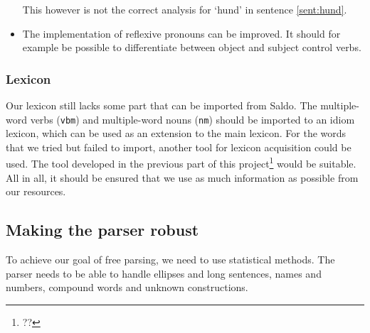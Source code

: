 \documentclass{report}
\begin{document}
\begin{itemize}
This however is not the correct analysis for `hund' in sentence \ref{sent:hund}.
\label{sent:hund}

\item
The implementation of reflexive pronouns can be improved.  %
It should for example be possible to differentiate between 
object and subject control verbs.


%

\end{itemize}
\subsubsection{Lexicon}
Our lexicon still lacks some part that can be imported from Saldo.
The multiple-word verbs (\verb-vbm-) and multiple-word nouns (\verb-nm-) should
be imported to an idiom lexicon, which can be used as an extension to the main
lexicon.
For the words that we tried but failed to import, another tool for lexicon
acquisition could be used. The tool developed in the previous part of
this project\footnote{??} would be suitable.
All in all, it should be ensured that we use as much information as
possible from our resources.


\subsection{Making the parser robust}
To achieve our goal of free parsing, we need to use statistical methods.
The parser needs to be able to handle
ellipses and long sentences, names and numbers,
compound words and unknown constructions.
\end{document}
